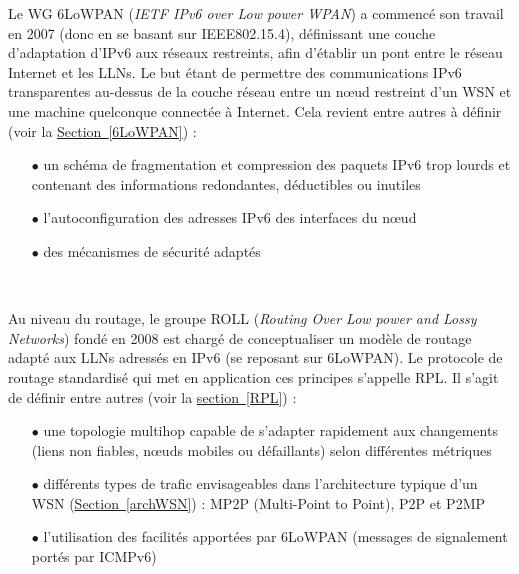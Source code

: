 \documentclass[]{report}
\newcommand{\wordlink}[2]{\hyperref[#2]{#1~\ref{#2}}}
\begin{document}
\par Le WG 6LoWPAN (\textit{IETF IPv6 over Low power WPAN}) a commencé son travail en 2007 (donc en se basant sur IEEE802.15.4), définissant une couche d'adaptation d'IPv6 aux réseaux restreints, afin d'établir un pont entre le réseau Internet et les LLNs. Le but étant de permettre des communications IPv6 transparentes au-dessus de la couche réseau entre un nœud restreint d'un WSN et une machine quelconque connectée à Internet. Cela revient entre autres à définir (voir la \wordlink{Section}{6LoWPAN}) :\\
\begin{itemize}
\item[$\bullet$] un schéma de fragmentation et compression des paquets IPv6 trop lourds et contenant des informations redondantes, déductibles ou inutiles
\vspace{0.1cm}
\item[$\bullet$] l'autoconfiguration des adresses IPv6 des interfaces du nœud
\vspace{0.1cm}
\item[$\bullet$] des mécanismes de sécurité adaptés
\end{itemize}
~\\
\par Au niveau du routage, le groupe ROLL (\textit{Routing Over Low power and Lossy Networks}) fondé en 2008 est chargé de conceptualiser un modèle de routage adapté aux LLNs adressés en IPv6 (se reposant sur 6LoWPAN). Le protocole de routage standardisé qui met en application ces principes s'appelle RPL. Il s'agit de définir entre autres (voir la \wordlink{section}{RPL}) :\\
\begin{itemize}
\item[$\bullet$] une topologie multihop capable de s'adapter rapidement aux changements (liens non fiables, nœuds mobiles ou défaillants) selon différentes métriques
\vspace{0.1cm}
\item[$\bullet$] différents types de trafic envisageables dans l'architecture typique d'un WSN (\wordlink{Section}{archWSN}) : MP2P (Multi-Point to Point), P2P et P2MP
\vspace{0.1cm}
\item[$\bullet$] l'utilisation des facilités apportées par 6LoWPAN (messages de signalement portés par ICMPv6)
\end{itemize}
~\\
\end{document}
